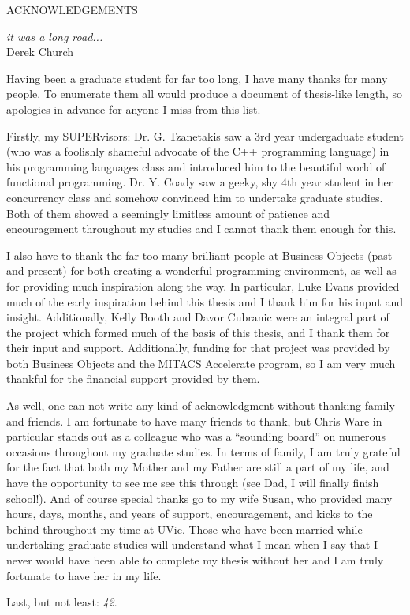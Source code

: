 \newpage
{}

\begin{center}
ACKNOWLEDGEMENTS
\end{center}

\begin{flushright}
\textit{it was a long road...}
\\
Derek Church\\
\end{flushright}

Having been a graduate student for far too long, I have many thanks for many people.  To enumerate them all would produce a document of thesis-like length, so apologies in advance for anyone I miss from this list.

Firstly, my SUPERvisors: Dr. G. Tzanetakis saw a 3rd year undergaduate student (who was a foolishly shameful advocate of the C++ programming language) in his programming languages class and introduced him to the beautiful world of functional programming.  Dr. Y. Coady saw a geeky, shy 4th year student in her concurrency class and somehow convinced him to undertake graduate studies.  Both of them showed a seemingly limitless amount of patience and encouragement throughout my studies and I cannot thank them enough for this.

I also have to thank the far too many brilliant people at Business Objects (past and present) for both creating a wonderful programming environment, as well as for providing much inspiration along the way.  In particular, Luke Evans provided much of the early inspiration behind this thesis and I thank him for his input and insight.  Additionally, Kelly Booth and Davor Cubranic were an integral part of the project which formed much of the basis of this thesis, and I thank them for their input and support.  Additionally, funding for that project was provided by both Business Objects and the MITACS Accelerate program, so I am very much thankful for the financial support provided by them.

As well, one can not write any kind of acknowledgment without thanking family and friends.  I am fortunate to have many friends to thank, but Chris Ware in particular stands out as a colleague who was a ``sounding board'' on numerous occasions throughout my graduate studies.  In terms of family, I am truly grateful for the fact that both my Mother and my Father are still a part of my life, and have the opportunity to see me see this through (see Dad, I will finally finish school!).  And of course special thanks go to my wife Susan, who provided many hours, days, months, and years of support, encouragement, and kicks to the behind throughout my time at UVic.  Those who have been married while undertaking graduate studies will understand what I mean when I say that I never would have been able to complete my thesis without her and I am truly fortunate to have her in my life.

Last, but not least: \emph{42}.
